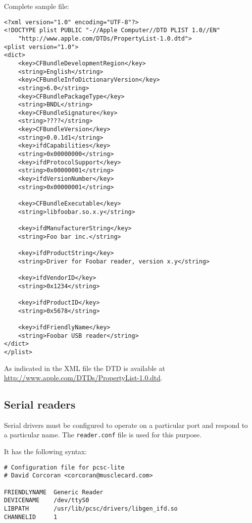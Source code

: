 \documentclass[a4paper,12pt]{article}
\begin{document}
Complete sample file:
\begin{verbatim}
<?xml version="1.0" encoding="UTF-8"?>
<!DOCTYPE plist PUBLIC "-//Apple Computer//DTD PLIST 1.0//EN"
    "http://www.apple.com/DTDs/PropertyList-1.0.dtd">
<plist version="1.0">
<dict>
    <key>CFBundleDevelopmentRegion</key>
    <string>English</string>
    <key>CFBundleInfoDictionaryVersion</key>
    <string>6.0</string>
    <key>CFBundlePackageType</key>
    <string>BNDL</string>
    <key>CFBundleSignature</key>
    <string>????</string>
    <key>CFBundleVersion</key>
    <string>0.0.1d1</string>
    <key>ifdCapabilities</key>
    <string>0x00000000</string>
    <key>ifdProtocolSupport</key>
    <string>0x00000001</string>
    <key>ifdVersionNumber</key>
    <string>0x00000001</string>

    <key>CFBundleExecutable</key>
    <string>libfoobar.so.x.y</string>

    <key>ifdManufacturerString</key>
    <string>Foo bar inc.</string>

    <key>ifdProductString</key>
    <string>Driver for Foobar reader, version x.y</string>

    <key>ifdVendorID</key>
    <string>0x1234</string>

    <key>ifdProductID</key>
    <string>0x5678</string>

    <key>ifdFriendlyName</key>
    <string>Foobar USB reader</string>
</dict>
</plist>
\end{verbatim}

As indicated in the XML file the DTD is available at
\url{http://www.apple.com/DTDs/PropertyList-1.0.dtd}.


\subsection{Serial readers}

Serial drivers must be configured to operate on a particular port and
respond to a particular name. The \texttt{reader.conf} file is used for
this purpose.

It has the following syntax:

\begin{verbatim}
# Configuration file for pcsc-lite
# David Corcoran <corcoran@musclecard.com>

FRIENDLYNAME  Generic Reader
DEVICENAME    /dev/ttyS0
LIBPATH       /usr/lib/pcsc/drivers/libgen_ifd.so
CHANNELID     1
\end{verbatim}
\end{document}
